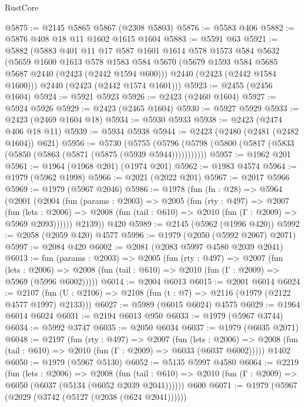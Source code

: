 \begin{lexlean}{RustCore}
\begin{coremodule}
@5875 := @2145 @5865 @5867 (@2308 @5803)
@5876 := @5583 @406
@5882 := @5876 @408 @18 @11 @1602 @1615 @1604
@5883 := @5591 @63
@5921 := @5882
    (@5883
      @401
      @11
      @17
      @587
      @1601
      @1614
      @578
      @1573
      @584
      @5632
      (@5659
        @1600
        @1613
        @578
        @1583
        @584
        @5670
        (@5679 @1593 @584 @5685 @5687 @2440 (@2423 (@2442 @1594 @600)))
        @2440
        (@2423 (@2442 @1584 @1600)))
      @2440
      (@2423 (@2442 @1574 @1601)))
@5923 := @2455 (@2456 @1604)
@5924 := @5921 @5923
@5926 := @2423 (@2460 @1604)
@5927 := @5924 @5926
@5929 := @2423 (@2465 @1604)
@5930 := @5927 @5929
@5933 := @2423 (@2469 @1604 @18)
@5934 := @5930 @5933
@5938 := @2423 (@2474 @406 @18 @11)
@5939 := @5934 @5938
@5944 := @2423 (@2480 (@2481 (@2482 @1604)) @621)
@5956 := @5730
    (@5755 (@5796 (@5798 (@5800 (@5817 (@5833 (@5850 (@5863 (@5871 (@5875 (@5939 @5944)))))))))))
@5957 := @1962 @201
@5961 := @1964 (@1968 @201) (@1974 @201)
@5962 := @1983 @4574
@5964 := @1979 (@5962 @1998)
@5966 := @2021 (@2022 @201)
@5967 := @2017 @5966
@5969 := @1979 (@5967 @2046)
@5986 := @1978
    (fun (fn : @28) =>
    @5964
      (@2001
        (@2004
          (fun (params : @2003) =>
          @2005
            (fun (rty : @497) =>
            @2007
              (fun (lets : @2006) =>
              @2008 (fun (tail : @610) => @2010 (fun (Γ : @2009) => @5969 @2093))))))
        @2139))
    @420
@5989 := @2145 (@5962 (@1996 @420))
@5992 := @2058 (@2059 @420) @4577
@5996 := @1979 (@2050 (@5992 @2067) @2071)
@5997 := @2084 @420
@6002 := @2081 (@2083 @5997 @4580 @2039 @2041)
@6013 := fun (params : @2003) =>
  @2005
    (fun (rty : @497) =>
    @2007
      (fun (lets : @2006) =>
      @2008 (fun (tail : @610) => @2010 (fun (Γ : @2009) => @5969 (@5996 @6002)))))
@6014 := @2004 @6013
@6015 := @2001 @6014
@6024 := @2107 (fun (U : @2106) => @2108 (fun (t : @7) => @2116 (@1979 (@2122 @4577 @1997) @2133)))
@6027 := @5989 (@6015 @6024) @4575
@6029 := @1964 @6014 @6024
@6031 := @2194 @6013 @950
@6033 := @1979 (@5967 @3744)
@6034 := @5992 @3747
@6035 := @2050 @6034
@6037 := @1979 (@6035 @2071)
@6048 := @2197
    (fun (rty : @497) =>
    @2007
      (fun (lets : @2006) =>
      @2008 (fun (tail : @610) => @2010 (fun (Γ : @2009) => @6033 (@6037 @6002)))))
    @1402
@6050 := @1979 (@5967 @5130)
@6052 := @5135 @5997 @4580
@6064 := @2219
    (fun (lets : @2006) =>
    @2008
      (fun (tail : @610) => @2010 (fun (Γ : @2009) => @6050 (@6037 (@5134 (@6052 @2039 @2041))))))
    @600
@6071 := @1979 (@5967 (@2029 (@3742 (@5127 (@2038 (@624 @2041))))))

\end{coremodule}
\end{lexlean}
